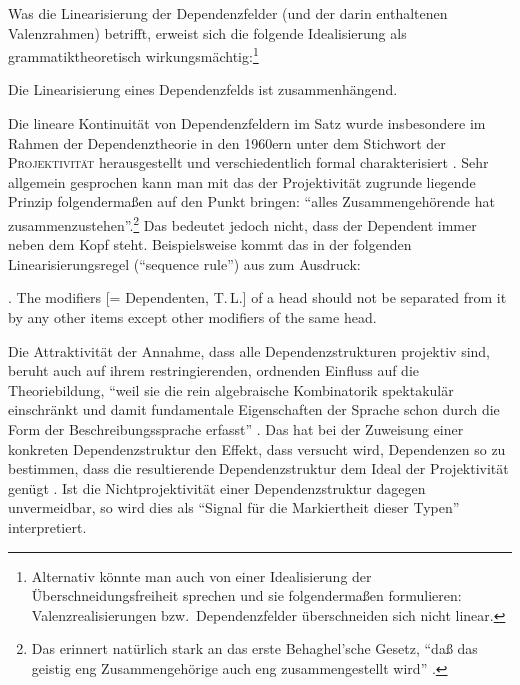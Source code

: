 Was die Linearisierung der Dependenzfelder (und der darin enthaltenen Valenzrahmen) betrifft, erweist sich die folgende Idealisierung als grammatiktheoretisch wirkungsmächtig:\footnote{Alternativ könnte man auch von einer Idealisierung der Überschneidungsfreiheit sprechen und sie folgenderma\ss en formulieren: Valenzrealisierungen bzw.\ Dependenzfelder überschneiden sich nicht linear.}  
\begin{idealisierung}
Die Linearisierung eines Dependenzfelds ist zusammenhängend.
\end{idealisierung}  
Die lineare Kontinuität von Dependenzfeldern im Satz wurde insbesondere im Rahmen der Dependenztheorie in den 1960ern unter dem Stichwort der \textsc{Projektivität} herausgestellt \citep[73ff]{Dikovsky:Modina:00} und verschiedentlich formal charakterisiert \citep[17ff]{Kuhlmann:10}. Sehr allgemein gesprochen kann man mit \citet[51]{Brettschneider:78} das der Projektivität zugrunde liegende Prinzip folgenderma\ss en auf den Punkt bringen: "`alles Zusammengehörende hat zusammenzustehen"'.\footnote{Das erinnert natürlich stark an das erste Behaghel'sche Gesetz, "`daß das geistig eng Zusammengehörige auch eng zusammengestellt wird"' \citep[\S 1426]{Behaghel:32}.} Das bedeutet jedoch nicht, dass der Dependent immer neben dem Kopf steht. Beispielsweise kommt das in der folgenden Linearisierungsregel ("`sequence rule"') aus \citet{Hudson:80} zum Ausdruck:

\ex. The modifiers [= Dependenten, T.\,L.] of a head should not be separated from it by any other items except other modifiers of the same head. \citep[(9)]{Hudson:80}
 
Die Attraktivität der Annahme, dass alle Dependenzstrukturen projektiv sind, beruht auch auf ihrem restringierenden, ordnenden Einfluss auf die Theoriebildung, "`weil sie die rein algebraische Kombinatorik spektakulär einschränkt und damit fundamentale Eigenschaften der Sprache schon durch die Form der Beschreibungssprache erfasst"' \citep[250]{Eroms:Heringer:03}. Das hat bei der Zuweisung einer konkreten Dependenzstruktur den Effekt, dass versucht wird, Dependenzen so zu bestimmen, dass die resultierende Dependenzstruktur dem Ideal der Projektivität genügt \citep[251]{Eroms:Heringer:03}. Ist die Nichtprojektivität einer Dependenzstruktur dagegen unvermeidbar, so wird dies als "`Signal für die Markiertheit dieser Typen"' \citep[259]{Eroms:Heringer:03} interpretiert.   

